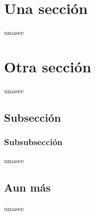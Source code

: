   \begin{abstract}
    Un ejemplo de documento que muestra como se puede unificar el formato e importar archivos en \LaTeX con el paquete '\emph{import}'.
  \end{abstract}

  \section{Una sección}
    {unasec}

  \section{Otra sección}
    {unasec}

    \subsection{Subsección}
      \subsubsection{Subsubsección}
        {unasec}

    \subsection{Aun más}
      {unasec}

\nocite{*} %
